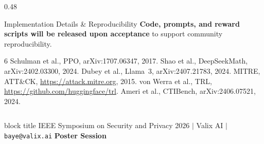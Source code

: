 \documentclass[final]{beamer}
\newcommand{\vsep}{\vspace{1.2em}}
\begin{document}
\begin{frame}[t]{}
\begin{columns}[T]
\begin{column}{0.48\linewidth}
\begin{block}{Implementation Details \& Reproducibility}
\vsep
\textbf{Code, prompts, and reward scripts will be released upon
acceptance} to support community reproducibility.

\end{block}

\vsep

{\small
\begin{thebibliography}{6}
    Schulman et al., PPO, arXiv:1707.06347, 2017.
   Shao et al., DeepSeekMath, arXiv:2402.03300, 2024.
 Dubey et al., Llama~3, arXiv:2407.21783, 2024.
  MITRE, ATT\&CK, \url{https://attack.mitre.org}, 2015.
    von Werra et al., TRL, \url{https://github.com/huggingface/trl}.
 Ameri et al., CTIBench, arXiv:2406.07521, 2024.
\end{thebibliography}
}

\end{column} %
\end{columns}

\vsep

\begin{beamercolorbox}[wd=\paperwidth, ht=2.5cm, dp=0pt,
    leftskip=1.5cm, rightskip=1.5cm]{block title}
  \vfill
  {\small\color{white}
    IEEE Symposium on Security and Privacy 2026 \quad$|$\quad
    Valix AI \quad$|$\quad \texttt{baye@valix.ai}}
  \hfill
  {\small\bfseries\color{spaccent} Poster Session}
  \vfill
\end{beamercolorbox}

\end{frame}
\end{document}
